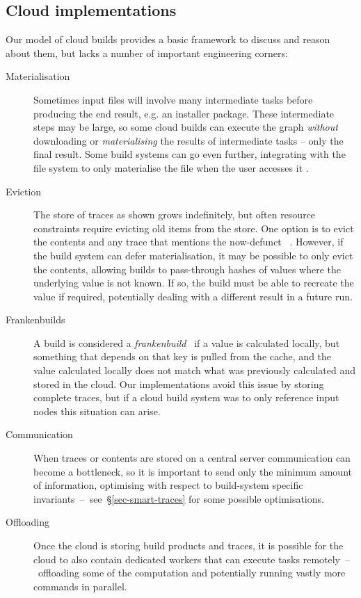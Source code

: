 \subsection{Cloud implementations}\label{sec-cloud-aspects}

Our model of cloud builds provides a basic framework to discuss and reason about them, but lacks a number of important engineering corners:

\begin{description}
\item[Materialisation] Sometimes input files will involve many intermediate tasks
before producing the end result, e.g. an installer package. These intermediate
steps may be large, so some cloud builds can execute the graph \emph{without}
downloading or \emph{materialising} the results of intermediate tasks -- only
the final result. Some build systems can go even further, integrating with the
file system to only materialise the file when the user accesses it \cite{gvfs}.

\item[Eviction] The store of traces as shown grows indefinitely, but often
resource constraints require evicting old items from the store. One option is
to evict the contents and any trace that mentions the now-defunct
~. However, if the build system can defer materialisation, it
may be possible to only evict the contents, allowing builds to pass-through
hashes of values where the underlying value is not known. If so, the build must
be able to recreate the value if required, potentially dealing with a different
result in a future run.

\item[Frankenbuilds] A build is considered a
\emph{frankenbuild}~\cite{esfahani2016cloudbuild} if a value is calculated
locally, but something that depends on that key is pulled from the cache, and
the value calculated locally does not match what was previously calculated and
stored in the cloud. Our implementations avoid this issue by storing complete
traces, but if a cloud build system was to only reference input nodes this
situation can arise.

\item[Communication] When traces or contents are stored on a central server
communication can become a bottleneck, so it is important to send only the
minimum amount of information, optimising with respect to build-system specific
invariants~--~see~\S\ref{sec-smart-traces} for some possible optimisations.

\item[Offloading] Once the cloud is storing build products and traces, it is
possible for the cloud to also contain dedicated workers that can execute tasks
remotely~--~offloading some of the computation and potentially running vastly
more commands in parallel.
\end{description}

